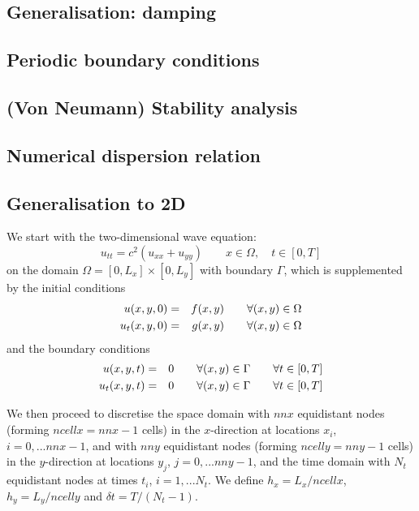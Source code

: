 \subsection{Generalisation: damping}

\subsection{Periodic boundary conditions}

\subsection{(Von Neumann) Stability analysis}

\subsection{Numerical dispersion relation}

\subsection{Generalisation to 2D}


We start with the two-dimensional wave equation:
\[
u_{tt}=c^2 (u_{xx} +u_{yy}) \qquad x\in\Omega, \quad t\in[0,T]
\]
on the domain $\Omega=[0,L_x]\times[0,L_y]$ with boundary $\Gamma$,
which is supplemented by the initial conditions
\begin{eqnarray}
u(x,y,0) &=& f(x,y)   \qquad  \forall (x,y)\in \Omega\nonumber\\
u_t(x,y,0) &=& g(x,y) \qquad  \forall (x,y)\in \Omega
\end{eqnarray}
and the boundary conditions
\begin{eqnarray}
u(x,y,t) &=& 0 \qquad \forall (x,y)\in \Gamma \qquad \forall t \in [0,T] \nonumber\\
u_t(x,y,t) &=& 0 \qquad \forall (x,y)\in \Gamma \qquad \forall t \in [0,T] 
\label{eq:fdm_wave_bc}
\end{eqnarray}


We then proceed to discretise the space domain with $nnx$ equidistant nodes (forming $ncellx=nnx-1$ cells) in the $x$-direction at locations $x_i$, $i=0,...nnx-1$,  
and with $nny$ equidistant nodes (forming $ncelly=nny-1$ cells) in the $y$-direction 
at locations $y_j$, $j=0,...nny-1$,
and the time domain with $N_t$ equidistant nodes at times
$t_i$, $i=1,...N_t$.
We define $h_x=L_x/ncellx$, $h_y=L_y/ncelly$ and $\delta\! t=T/(N_t-1)$.



